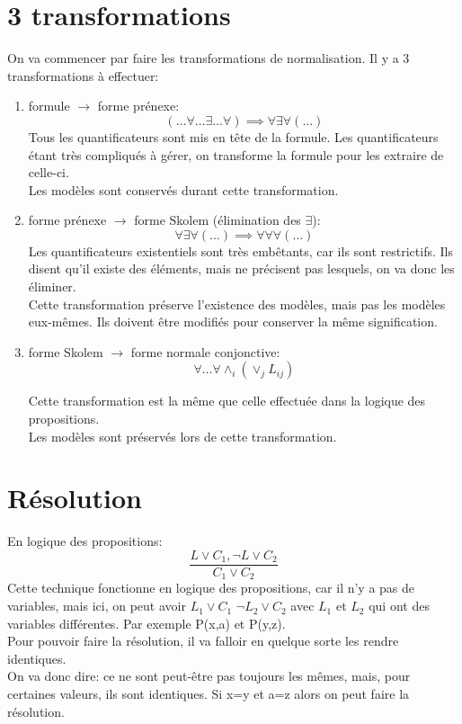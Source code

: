{\section{3 transformations} 
On va commencer par faire les transformations de normalisation. Il y a 3 transformations à effectuer: 
\begin{enumerate}
    \item formule $\to$ forme prénexe: $$(\ldots{}\forall{}\ldots{}\exists{}\ldots{}\forall{} )\implies \forall{}\exists{}\forall{}(\ldots{})$$
    Tous les quantificateurs sont mis en tête de la formule. Les quantificateurs étant très compliqués à gérer, on transforme la formule pour les extraire de celle-ci. \\Les modèles sont conservés durant cette transformation.
    \item forme prénexe $\to$ forme Skolem (élimination des $\exists{}$): $$ \forall{}\exists{}\forall{}(\ldots{})  \implies \forall{}\forall{}\forall{}(\ldots{}) $$
    Les quantificateurs existentiels sont très embêtants, car ils sont restrictifs. Ils disent qu'il existe des éléments, mais ne précisent pas lesquels, on va donc les éliminer. \\
    Cette transformation préserve l'existence des modèles, mais pas les modèles eux-mêmes. Ils doivent être modifiés pour conserver la même signification. 
    \item forme Skolem $\to$ forme normale conjonctive: 
    \[\forall \ldots \forall \land_i(\lor_j L_{ij})\]

Cette transformation est la même que celle effectuée dans la logique des propositions. \\
Les modèles sont préservés lors de cette transformation. 
\end{enumerate}

\section{Résolution}
En logique des propositions: $$\frac{L\lor C_1, \neg L \lor C_2}{C_1\lor C_2}$$
Cette technique fonctionne en logique des propositions, car il n'y a pas de variables, mais ici, on peut avoir $L_1 \lor C_1$ \hspace{10pt} $\neg L_2 \lor C_2$  avec $L_1$ et $L_2$ qui ont des variables différentes. Par exemple P(x,a) et P(y,z).\\
Pour pouvoir faire la résolution, il va falloir en quelque sorte les rendre identiques. \\
On va donc dire: ce ne sont peut-être pas toujours les mêmes, mais, pour certaines valeurs, ils sont identiques. Si x=y et a=z alors on peut faire la résolution. 
}
